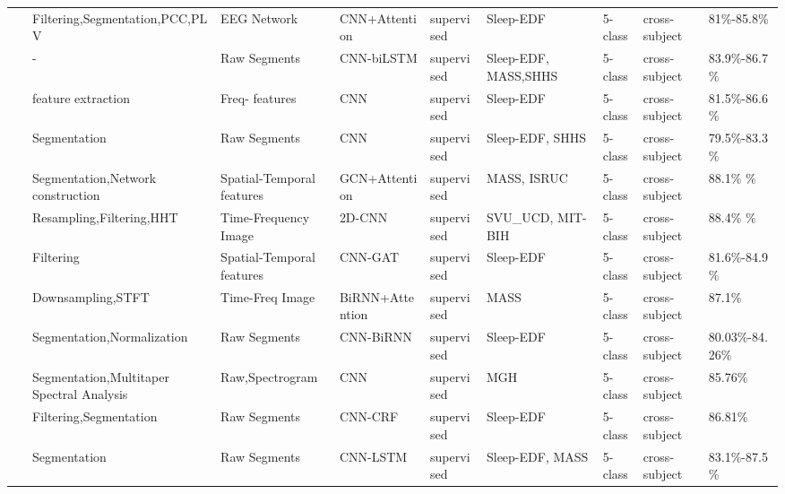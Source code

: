 \begin{table*}[ht]
\begin{tabular}{p{0.4cm}p{2.8cm}p{2cm}p{1.5cm}p{1.9cm}p{1.9cm}p{0.8cm}p{1.8cm}p{2cm}}
~\cite{Sleep10} & Filtering,Segmentation,\newline PCC,PLV & EEG Network & CNN+Attention & supervised & Sleep-EDF & 5-class & cross-subject & 81\%-85.8\% \\
~\cite{Sleep11} & - & Raw Segments & CNN-biLSTM & supervised & Sleep-EDF, \newline MASS,\newline SHHS & 5-class  & cross-subject & 83.9\%-86.7\% \\
~\cite{Sleep12} & feature extraction & Freq- features & CNN & supervised & Sleep-EDF & 5-class & cross-subject & 81.5\%-86.6\% \\
~\cite{Sleep13} & Segmentation & Raw Segments & CNN & supervised & Sleep-EDF, \newline SHHS & 5-class & cross-subject & 79.5\%-83.3\% \\
~\cite{Sleep14} & Segmentation,Network construction & Spatial-Temporal features & GCN+Attention & supervised & MASS, \newline ISRUC & 5-class  & cross-subject & 88.1\% \newline 90.5\% \\
~\cite{ZHANG2020105089} & Resampling,Filtering,HHT & Time-Frequency Image & 2D-CNN & supervised & SVU\_UCD, \newline MIT-BIH & 5-class  & cross-subject & 88.4\% \newline 87.6\% \\
~\cite{Sleep16} & Filtering & Spatial-Temporal features & CNN-GAT & supervised & Sleep-EDF & 5-class  & cross-subject & 81.6\%-84.9\% \\
~\cite{phan2019seqsleepnet} & Downsampling,STFT & Time-Freq Image & BiRNN\newline +Attention & supervised & MASS & 5-class & cross-subject & 87.1\% \\
~\cite{Sleep18} & Segmentation,\newline Normalization & Raw Segments & CNN-BiRNN & supervised & Sleep-EDF & 5-class  & cross-subject & 80.03\%-84.26\% \\
~\cite{Sleep19} & Segmentation,Multitaper Spectral Analysis & Raw,Spectrogram & CNN & supervised & MGH & 5-class & cross-subject & 85.76\% \\
~\cite{Sleep20} & Filtering,Segmentation & Raw Segments & CNN-CRF & supervised & Sleep-EDF & 5-class & cross-subject & 86.81\% \\
~\cite{Sleep21} & Segmentation & Raw Segments & CNN-LSTM & supervised & Sleep-EDF, \newline MASS & 5-class & cross-subject & 83.1\%-87.5\% \\

\end{tabular}
\end{table*}
